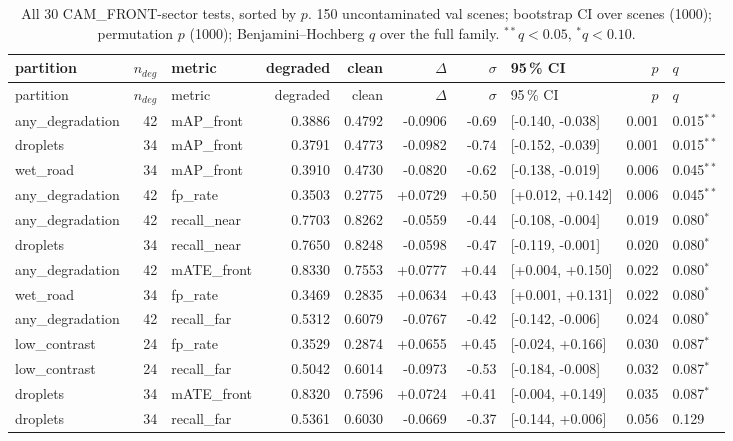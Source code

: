 \begin{longtable}{l r l r r r r l r l}
\caption{All 30 CAM\_FRONT-sector tests, sorted by $p$. 150 uncontaminated val scenes; bootstrap CI over scenes (1000); permutation $p$ (1000); Benjamini--Hochberg $q$ over the full family. $^{**}q<0.05$, $^{*}q<0.10$.}\label{tab:bh}\\
\toprule
partition & $n_{deg}$ & metric & degraded & clean & $\Delta$ & $\sigma$ & 95\,\% CI & $p$ & $q$\\
\midrule
\endfirsthead
\toprule
partition & $n_{deg}$ & metric & degraded & clean & $\Delta$ & $\sigma$ & 95\,\% CI & $p$ & $q$\\
\midrule
\endhead
\bottomrule
\endfoot
any\_degradation & 42 & mAP\_front & 0.3886 & 0.4792 & -0.0906 & -0.69 & [-0.140, -0.038] & 0.001 & 0.015$^{**}$\\
droplets & 34 & mAP\_front & 0.3791 & 0.4773 & -0.0982 & -0.74 & [-0.152, -0.039] & 0.001 & 0.015$^{**}$\\
wet\_road & 34 & mAP\_front & 0.3910 & 0.4730 & -0.0820 & -0.62 & [-0.138, -0.019] & 0.006 & 0.045$^{**}$\\
any\_degradation & 42 & fp\_rate & 0.3503 & 0.2775 & +0.0729 & +0.50 & [+0.012, +0.142] & 0.006 & 0.045$^{**}$\\
any\_degradation & 42 & recall\_near & 0.7703 & 0.8262 & -0.0559 & -0.44 & [-0.108, -0.004] & 0.019 & 0.080$^{*}$\\
droplets & 34 & recall\_near & 0.7650 & 0.8248 & -0.0598 & -0.47 & [-0.119, -0.001] & 0.020 & 0.080$^{*}$\\
any\_degradation & 42 & mATE\_front & 0.8330 & 0.7553 & +0.0777 & +0.44 & [+0.004, +0.150] & 0.022 & 0.080$^{*}$\\
wet\_road & 34 & fp\_rate & 0.3469 & 0.2835 & +0.0634 & +0.43 & [+0.001, +0.131] & 0.022 & 0.080$^{*}$\\
any\_degradation & 42 & recall\_far & 0.5312 & 0.6079 & -0.0767 & -0.42 & [-0.142, -0.006] & 0.024 & 0.080$^{*}$\\
low\_contrast & 24 & fp\_rate & 0.3529 & 0.2874 & +0.0655 & +0.45 & [-0.024, +0.166] & 0.030 & 0.087$^{*}$\\
low\_contrast & 24 & recall\_far & 0.5042 & 0.6014 & -0.0973 & -0.53 & [-0.184, -0.008] & 0.032 & 0.087$^{*}$\\
droplets & 34 & mATE\_front & 0.8320 & 0.7596 & +0.0724 & +0.41 & [-0.004, +0.149] & 0.035 & 0.087$^{*}$\\
droplets & 34 & recall\_far & 0.5361 & 0.6030 & -0.0669 & -0.37 & [-0.144, +0.006] & 0.056 & 0.129\\

\end{longtable}
